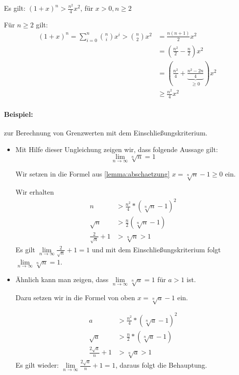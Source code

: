 \begin{lemma}{}\label{lemma:abschaetzung}
	Es gilt: $(1+x)^n>\frac{n^2}{4}x^2$, für $x>0, n\geq 2$
\end{lemma}
\beweis
Für $n\geq2$ gilt:
\begin{align*}
	(1+x)^n=\sum\limits_{i=0}^n\binom{n}{i}x^i>\binom{n}{2}x^2&=\frac{n(n+1)}{2}x^2\\
	&=\left(\frac{n^2}{2}-\frac n2 \right)x^2\\
	&=\left(\frac{n^2}4 + \underbrace{\frac{n^2-2n}{4}}_{\geq 0}\right)x^2\\
	&\geq \frac{n^2}4 x^2
\end{align*}

\paragraph{Beispiel:} zur Berechnung von Grenzwerten mit dem Einschließungskriterium.
\begin{itemize}
	\item Mit Hilfe dieser Ungleichung zeigen wir, dass folgende Aussage gilt:
	$$\lim\limits_{n\to\infty}\sqrt[n]{n}=1$$

	Wir setzen in die Formel aus \autoref{lemma:abschaetzung} $x=\sqrt[n]{n}-1\geq 0$ ein.

	Wir erhalten
	\begin{align*}
		n&>\frac{n^2}{4}*(\sqrt[n]{n}-1)^2\\
		\sqrt{n}&>\frac n2(\sqrt[n]{n}-1)\\
		\frac2{\sqrt{n}}+1&>\sqrt[n]{n}>1
	\end{align*}
	Es gilt $\lim\limits_{n\to\infty}\frac2{\sqrt{n}}+1 = 1$ und mit dem Einschließungskriterium folgt $\lim\limits_{n\to\infty}\sqrt[n]{n}=1$.

	\item Ähnlich kann man zeigen, dass $\lim\limits_{n\to\infty}\sqrt[n]{a}=1$ für $a>1$ ist.

	Dazu setzen wir in die Formel von oben $x=\sqrt[n]{a}-1$ ein.

	\begin{align*}
		a&>\frac{n^2}{4}*(\sqrt[n]{a}-1)^2\\
		\sqrt{a}&>\frac n2*(\sqrt[n]{a}-1)\\
		\frac{2\sqrt{a}}{n}+1&>\sqrt[n]{a}>1
	\end{align*}
	Es gilt wieder: $\lim\limits_{n\to\infty}\frac{2\sqrt{a}}{n}+1=1$, daraus folgt die Behauptung.
\end{itemize}

